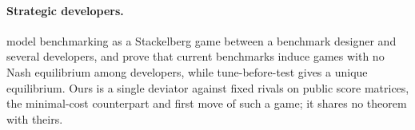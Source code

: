 \paragraph{Strategic developers.}
\citet{chen2026leaderboard} model benchmarking as a Stackelberg game between a benchmark designer and several developers, and prove that current benchmarks induce games with no Nash equilibrium among developers, while tune-before-test gives a unique equilibrium. Ours is a single deviator against fixed rivals on public score matrices, the minimal-cost counterpart and first move of such a game; it shares no theorem with theirs.
